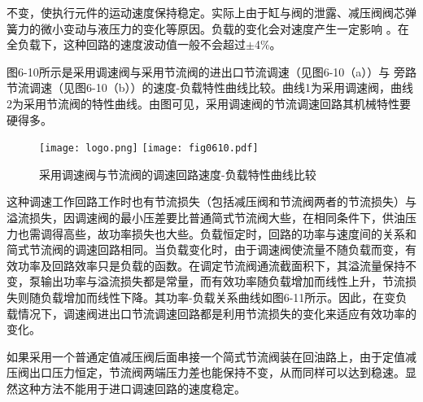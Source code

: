 不变，使执行元件的运动速度保持稳定。实际上由于缸与阀的泄露、减压阀阀芯弹簧力的微小变动与液压力的变化等原因。负载的变化会对速度产生一定影响 。在全负载下，这种回路的速度波动值一般不会超过$\pm$4\%。

图6-10所示是采用调速阀与采用节流阀的进出口节流调速（见图6-10（a））与 旁路节流调速（见图6-10（b））的速度-负载特性曲线比较。曲线1为采用调速阀，曲线2为采用节流阀的特性曲线。由图可见，采用调速阀的节流调速回路其机械特性要硬得多。
\begin{figure}\centering
\ifOpenSource
\texttt{[image: logo.png]}
\else
\texttt{[image: fig0610.pdf]}
\fi
\caption{采用调速阀与节流阀的调速回路速度-负载特性曲线比较}
\label{fig:fig0610}
\end{figure}
这种调速工作回路工作时也有节流损失（包括减压阀和节流阀两者的节流损失）与溢流损失，因调速阀的最小压差要比普通简式节流阀大些，在相同条件下，供油压力也需调得高些，故功率损失也大些。负载恒定时，回路的功率与速度间的关系和简式节流阀的调速回路相同。当负载变化时，由于调速阀使流量不随负载而变，有效功率及回路效率只是负载的函数。在调定节流阀通流截面积下，其溢流量保持不变，泵输出功率与溢流损失都是常量，而有效功率随负载增加而线性上升，节流损失则随负载增加而线性下降。其功率-负载关系曲线如图6-11所示。因此，在变负载情况下，调速阀进出口节流调速回路都是利用节流损失的变化来适应有效功率的变化。

如果采用一个普通定值减压阀后面串接一个简式节流阀装在回油路上，由于定值减压阀出口压力恒定，节流阀两端压力差也能保持不变，从而同样可以达到稳速。显然这种方法不能用于进口调速回路的速度稳定。

